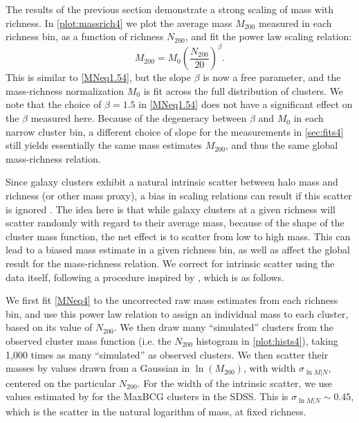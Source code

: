 \label{sec:MN4}
The results of the previous section demonstrate a strong scaling of mass with richness. In \autoref{plot:massrich4} we plot the average mass $M_{200}$ measured in each richness bin, as a function of richness $N_{200}$, and fit the power law scaling relation:
\begin{equation}
\label{MNeq4}
M_{200} = M_0 \left( \frac{N_{200}}{20} \right)^\beta.
\end{equation}
This is similar to \autoref{MNeq1.54}, but the slope $\beta$ is now a free parameter, and the mass-richness normalization $M_0$ is fit across the full distribution of clusters. We note that the choice of $\beta=1.5$ in \autoref{MNeq1.54} does not have a significant effect on the $\beta$ measured here. Because of the degeneracy between $\beta$ and $M_0$ in each narrow cluster bin, a different choice of slope for the measurements in \autoref{sec:fits4} still yields essentially the same mass estimates $M_{200}$, and thus the same global mass-richness relation.

Since galaxy clusters exhibit a natural intrinsic scatter between halo mass and richness (or other mass proxy), a bias in scaling relations can result if this scatter is ignored \citep{Rozo09a}. The idea here is that while galaxy clusters at a given richness will scatter randomly with regard to their average mass, because of the shape of the cluster mass function, the net effect is to scatter from low to high mass. This can lead to a biased mass estimate in a given richness bin, as well as affect the global result for the mass-richness relation. We correct for intrinsic scatter using the data itself, following a procedure inspired by \citet{Velander14}, which is as follows.

We first fit \autoref{MNeq4} to the uncorrected raw mass estimates from each richness bin, and use this power law relation to assign an individual mass to each cluster, based on its value of $N_{200}$. We then draw many ``simulated'' clusters from the observed cluster mass function (i.e. the $N_{200}$ histogram in \autoref{plot:hists4}), taking 1,000 times as many ``simulated'' as observed clusters. We then scatter their masses by values drawn from a Gaussian in $\ln (M_{200})$, with width $\sigma_{\ln M|N}$, centered on the particular $N_{200}$. For the width of the intrinsic scatter, we use values estimated by \citet{Rozo09a} for the MaxBCG clusters in the \ac{SDSS}. This is $\sigma_{\ln M|N} \sim 0.45$, which is the scatter in the natural logarithm of mass, at fixed richness.


